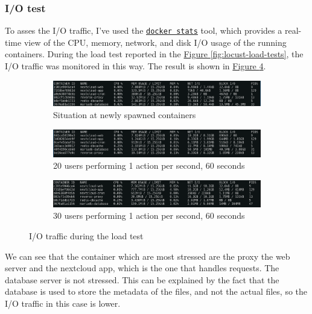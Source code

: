 \subsubsection{I/O test}
\label{subsubsec:test}

To asses the I/O traffic, I've used the \href{https://docs.docker.com/config/containers/runmetrics/}{\texttt{docker stats}} tool, which provides a real-time view of the CPU, memory, network, and disk I/O usage of the running containers.
During the load test reported in the \hyperref[fig:locust-load-tests]{Figure \ref{fig:locust-load-tests}}, the I/O traffic was monitored in this way. The result is shown in \hyperref[fig:docker-stats]{Figure \ref{fig:docker-stats}}.

\begin{figure}[H]
    \centering
    \begin{subfigure}{\textwidth}
        \includegraphics[width=\linewidth]{./images/ex1/newspawedIO}
        \caption{Situation at newly spawned containers}
        \label{fig:newspawedIO}
    \end{subfigure}
    \begin{subfigure}{\textwidth}
        \includegraphics[width=\linewidth]{./images/ex1/20usersIO}
        \caption{20 users performing 1 action per second, 60 seconds}
        \label{fig:20usersIO}
    \end{subfigure}
    \begin{subfigure}{\textwidth}
        \includegraphics[width=\linewidth]{./images/ex1/30usersIO}
        \caption{30 users performing 1 action per second, 60 seconds}
        \label{fig:30usersIO}
    \end{subfigure}
    \caption{I/O traffic during the load test}
    \label{fig:docker-stats}
\end{figure}

We can see that the container which are most stressed are the proxy the web server and the nextcloud app, which is the one that handles requests.
The database server is not stressed. This can be explained by the fact that the database is used to store the metadata of the files, and not the actual files, so the I/O traffic in this case is lower. 

